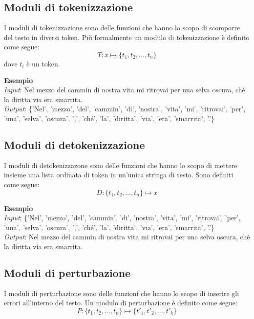 \documentclass[12pt]{article}
\begin{document}
\subsection{Moduli di tokenizzazione}
I moduli di tokenizzazione sono delle funzioni che hanno lo scopo di scomporre del testo in diversi token. Più formalmente un modulo di tokenizzazione è definito come segue:
\begin{equation}
T: x \mapsto \{ t_1,t_2,..., t_n  \}
\end{equation}
dove $t_i$ è un token.

\noindent
\textbf{Esempio}
\\
\textit{Input}: Nel mezzo del cammin di nostra vita mi ritrovai per una selva oscura,	ché la diritta via era smarrita.
\\
\textit{Output}: \{'Nel', 'mezzo', 'del', 'cammin', 'di', 'nostra', 'vita', 'mi', 'ritrovai', 'per', 'una', 'selva', 'oscura', ',', 'ché', 'la', 'diritta', 'via', 'era', 'smarrita', '.'\}


\subsection{Moduli di detokenizzazione}
I moduli di detokenizzazone sono delle funzioni che hanno lo scopo di mettere insieme una lista ordinata di token in un'unica stringa di testo. Sono definiti come segue:
\begin{equation}
D: \{ t_1,t_2,..., t_n  \} \mapsto x
\end{equation}

\noindent
\textbf{Esempio}
\\
\textit{Input}: \{'Nel', 'mezzo', 'del', 'cammin', 'di', 'nostra', 'vita', 'mi', 'ritrovai', 'per', 'una', 'selva', 'oscura', ',', 'ché', 'la', 'diritta', 'via', 'era', 'smarrita', '.'\}
\\
\textit{Output}: Nel mezzo del cammin di nostra vita mi ritrovai per una selva oscura,	ché la diritta via era smarrita.


\subsection{Moduli di perturbazione}
I moduli di perturbazione sono delle funzioni che hanno lo scopo di inserire gli errori all'interno del testo. Un modulo di perturbazione è definito come segue:
\begin{equation}
P: \{ t_1,t_2,..., t_n  \} \mapsto \{ t'_1,t'_2,..., t'_k  \}
\end{equation}
\end{document}
